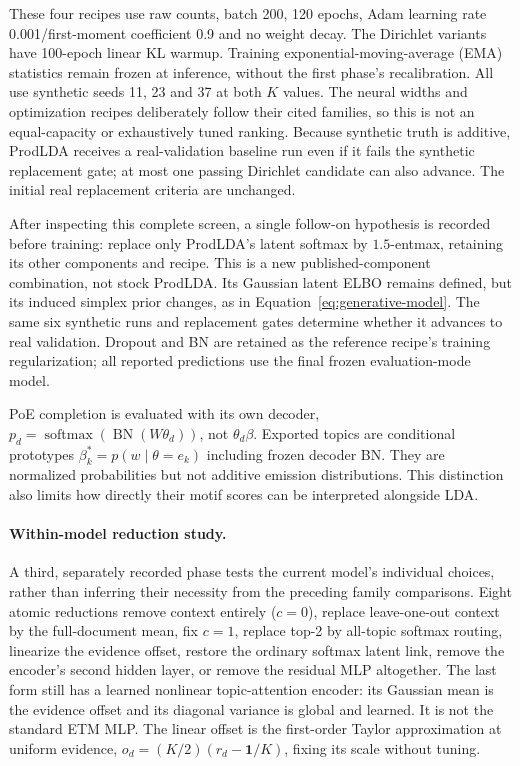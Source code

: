 \documentclass[10pt,a4paper]{article}
\begin{document}
These four recipes use raw counts, batch 200, 120 epochs, Adam learning rate
0.001/first-moment coefficient 0.9 and no weight decay. The Dirichlet variants
have 100-epoch linear KL warmup. Training exponential-moving-average (EMA)
statistics remain frozen
at inference, without the first phase's recalibration. All use synthetic
seeds 11, 23 and 37 at both $K$ values. The neural widths and optimization
recipes deliberately follow their cited families, so this is not an
equal-capacity or exhaustively tuned ranking. Because synthetic truth is
additive, ProdLDA receives a real-validation baseline run even if it fails the
synthetic replacement gate; at most one passing Dirichlet candidate can also
advance. The initial real replacement criteria are unchanged.

After inspecting this complete screen, a single follow-on hypothesis is
recorded before training: replace only ProdLDA's latent softmax by
$1.5$-entmax, retaining its other components and recipe. This is a new
published-component combination, not stock ProdLDA. Its Gaussian latent ELBO
remains defined, but its induced simplex prior changes, as in
Equation~\ref{eq:generative-model}. The same six synthetic runs and replacement
gates determine whether it advances to real validation. Dropout and BN are
retained as the reference recipe's training regularization; all reported
predictions use the final frozen evaluation-mode model.

PoE completion is evaluated with its own decoder,
$p_d=\operatorname{softmax}(\operatorname{BN}(W\theta_d))$, not
$\theta_d\beta$. Exported topics are conditional prototypes
$\beta_k^*=p(w\mid\theta=e_k)$ including frozen decoder BN. They are normalized
probabilities but not additive emission distributions. This distinction also
limits how directly their motif scores can be interpreted alongside LDA.

\paragraph{Within-model reduction study.}
A third, separately recorded phase tests the current model's individual
choices, rather than inferring their necessity from the preceding family
comparisons. Eight atomic reductions remove context entirely ($c=0$), replace
leave-one-out context by the full-document mean, fix $c=1$, replace top-2 by
all-topic softmax routing, linearize the evidence offset, restore the ordinary
softmax latent link, remove the encoder's second hidden layer, or remove the
residual MLP altogether. The last form still has a learned nonlinear
topic-attention encoder: its Gaussian mean is the evidence offset and its
diagonal variance is global and learned. It is not the standard ETM MLP.
The linear offset is the first-order Taylor approximation at uniform evidence,
$o_d=(K/2)(r_d-\mathbf{1}/K)$, fixing its scale without tuning.
\end{document}
